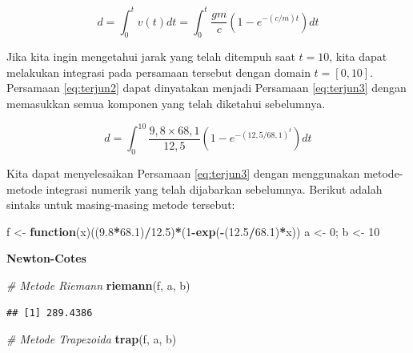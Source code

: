 \documentclass[]{book}
\newenvironment{Shaded}{\begin{snugshade}}{\end{snugshade}}
\newcommand{\CommentTok}[1]{\textcolor[rgb]{0.56,0.35,0.01}{\textit{#1}}}
\newcommand{\ControlFlowTok}[1]{\textcolor[rgb]{0.13,0.29,0.53}{\textbf{#1}}}
\newcommand{\DecValTok}[1]{\textcolor[rgb]{0.00,0.00,0.81}{#1}}
\newcommand{\FloatTok}[1]{\textcolor[rgb]{0.00,0.00,0.81}{#1}}
\newcommand{\KeywordTok}[1]{\textcolor[rgb]{0.13,0.29,0.53}{\textbf{#1}}}
\newcommand{\NormalTok}[1]{#1}
\newcommand{\OperatorTok}[1]{\textcolor[rgb]{0.81,0.36,0.00}{\textbf{#1}}}
\newcommand{\StringTok}[1]{\textcolor[rgb]{0.31,0.60,0.02}{#1}}
\theoremstyle{definition}
\theoremstyle{definition}
\theoremstyle{definition}
\theoremstyle{remark}
\begin{document}
\begin{equation}
d=\int_{0}^{t}v\left(t\right)dt=\int_{0}^{t}\frac{gm}{c}\left(1-e^{-\left(c/m\right)t}\right)dt
  \label{eq:terjun2}
\end{equation}

Jika kita ingin mengetahui jarak yang telah ditempuh saat \(t=10\), kita dapat melakukan integrasi pada persamaan tersebut dengan domain \(t=\left[0,10\right]\). Persamaan \eqref{eq:terjun2} dapat dinyatakan menjadi Persamaan \eqref{eq:terjun3} dengan memasukkan semua komponen yang telah diketahui sebelumnya.

\begin{equation}
d=\int_{0}^{10}\frac{9,8\times 68,1}{12,5}\left(1-e^{-\left(12,5/68,1\right)^t}\right)dt
  \label{eq:terjun3}
\end{equation}

Kita dapat menyelesaikan Persamaan \eqref{eq:terjun3} dengan menggunakan metode-metode integrasi numerik yang telah dijabarkan sebelumnya. Berikut adalah sintaks untuk masing-masing metode tersebut:

\begin{Shaded}
\begin{Highlighting}[]
\NormalTok{f <-}\StringTok{ }\ControlFlowTok{function}\NormalTok{(x)((}\FloatTok{9.8}\OperatorTok{*}\FloatTok{68.1}\NormalTok{)}\OperatorTok{/}\FloatTok{12.5}\NormalTok{)}\OperatorTok{*}\NormalTok{(}\DecValTok{1}\OperatorTok{-}\KeywordTok{exp}\NormalTok{(}\OperatorTok{-}\NormalTok{(}\FloatTok{12.5}\OperatorTok{/}\FloatTok{68.1}\NormalTok{)}\OperatorTok{*}\NormalTok{x))}
\NormalTok{a <-}\StringTok{ }\DecValTok{0}\NormalTok{; b <-}\StringTok{ }\DecValTok{10}
\end{Highlighting}
\end{Shaded}

\textbf{Newton-Cotes}

\begin{Shaded}
\begin{Highlighting}[]
\CommentTok{# Metode Riemann}
\KeywordTok{riemann}\NormalTok{(f, a, b)}
\end{Highlighting}
\end{Shaded}

\begin{verbatim}
## [1] 289.4386
\end{verbatim}

\begin{Shaded}
\begin{Highlighting}[]
\CommentTok{# Metode Trapezoida}
\KeywordTok{trap}\NormalTok{(f, a, b)}
\end{Highlighting}
\end{Shaded}
\end{document}
